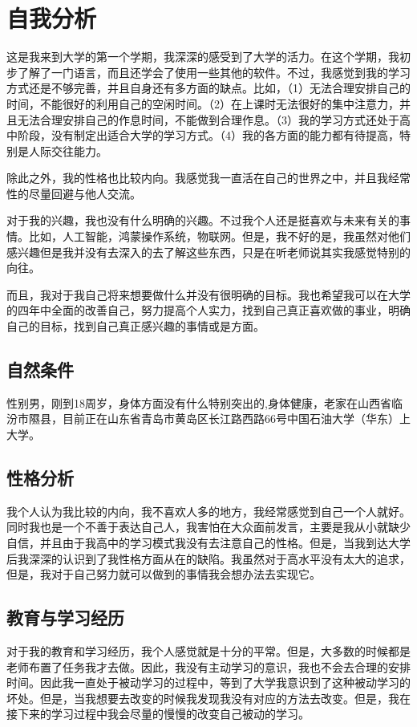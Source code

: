 \documentclass{article}
\begin{document}
\thispagestyle{empty}
\newpage
\setcounter{page}{1}
\section{自我分析}
	这是我来到大学的第一个学期，我深深的感受到了大学的活力。在这个学期，我初步了解了一门语言，而且还学会了使用一些其他的软件。不过，我感觉到我的学习方式还是不够完善，并且自身还有多方面的缺点。比如，（1）无法合理安排自己的时间，不能很好的利用自己的空闲时间。（2）在上课时无法很好的集中注意力，并且无法合理安排自己的作息时间，不能做到合理作息。（3）我的学习方式还处于高中阶段，没有制定出适合大学的学习方式。（4）我的各方面的能力都有待提高，特别是人际交往能力。

    除此之外，我的性格也比较内向。我感觉我一直活在自己的世界之中，并且我经常性的尽量回避与他人交流。
    
    对于我的兴趣，我也没有什么明确的兴趣。不过我个人还是挺喜欢与未来有关的事情。比如，人工智能，鸿蒙操作系统，物联网。但是，我不好的是，我虽然对他们感兴趣但是我并没有去深入的去了解这些东西，只是在听老师说其实我感觉特别的向往。

    而且，我对于我自己将来想要做什么并没有很明确的目标。我也希望我可以在大学的四年中全面的改善自己，努力提高个人实力，找到自己真正喜欢做的事业，明确自己的目标，找到自己真正感兴趣的事情或是方面。\par
\par\subsection{自然条件}
    性别男，刚到18周岁，身体方面没有什么特别突出的,身体健康，老家在山西省临汾市隰县，目前正在山东省青岛市黄岛区长江路西路66号中国石油大学（华东）上大学。\par
\subsection{性格分析}
    我个人认为我比较的内向，我不喜欢人多的地方，我经常感觉到自己一个人就好。同时我也是一个不善于表达自己人，我害怕在大众面前发言，主要是我从小就缺少自信，并且由于我高中的学习模式我没有去注意自己的性格。但是，当我到达大学后我深深的认识到了我性格方面从在的缺陷。我虽然对于高水平没有太大的追求，但是，我对于自己努力就可以做到的事情我会想办法去实现它。\par
\subsection{教育与学习经历}
    对于我的教育和学习经历，我个人感觉就是十分的平常。但是，大多数的时候都是老师布置了任务我才去做。因此，我没有主动学习的意识，我也不会去合理的安排时间。因此我一直处于被动学习的过程中，等到了大学我意识到了这种被动学习的坏处。但是，当我想要去改变的时候我发现我没有对应的方法去改变。但是，我在接下来的学习过程中我会尽量的慢慢的改变自己被动的学习。\par
\end{document}
